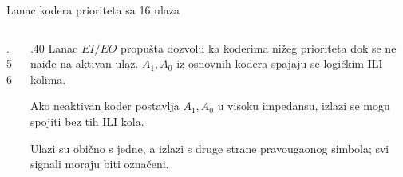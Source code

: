 \begin{frame}[label=03-s021]{Lanac kodera prioriteta sa 16 ulaza}
\begin{columns}[c,onlytextwidth]
\begin{column}{.56\textwidth}\centering

\end{column}
\begin{column}{.40\textwidth}
Lanac \(EI/EO\) propušta dozvolu ka koderima nižeg prioriteta dok se ne naiđe na aktivan ulaz. \(A_1,A_0\) iz osnovnih kodera spajaju se logičkim ILI kolima.
\par\vspace{2mm}
Ako neaktivan koder postavlja \(A_1,A_0\) u visoku impedansu, izlazi se mogu spojiti bez tih ILI kola.
\par\vspace{2mm}
Ulazi su obično s jedne, a izlazi s druge strane pravougaonog simbola; svi signali moraju biti označeni.
\end{column}
\end{columns}
\end{frame}
